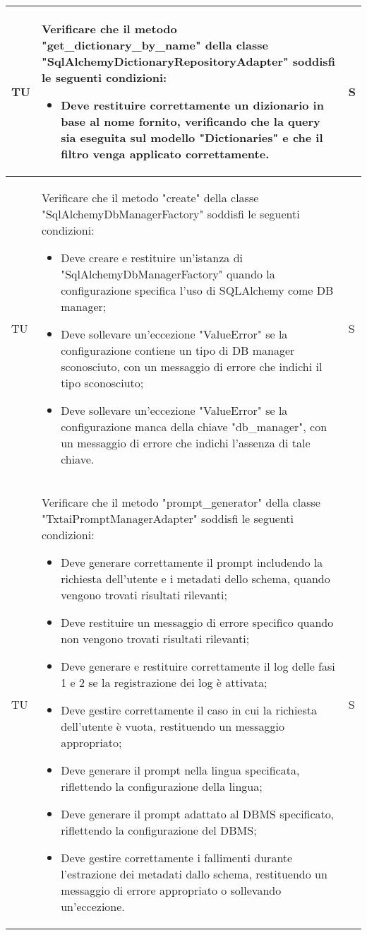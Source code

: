 \begin{adjustwidth}{-0.5cm}{-0.5cm}
\begin{longtable}{|P{1.5cm}|>{\raggedright}P{9.5cm}|>{\arraybackslash}P{1.5cm}|}
	\hline TU & Verificare che il metodo "get\_dictionary\_by\_name" della classe "SqlAlchemyDictionaryRepositoryAdapter" soddisfi le seguenti condizioni:
	\begin{itemize}
		\item Deve restituire correttamente un dizionario in base al nome fornito, verificando che la query sia eseguita sul modello "Dictionaries" e che il filtro venga applicato correttamente.
	\end{itemize} & S \\

		\hline TU & Verificare che il metodo "create" della classe "SqlAlchemyDbManagerFactory" soddisfi le seguenti condizioni:
	\begin{itemize}
		\item Deve creare e restituire un'istanza di "SqlAlchemyDbManagerFactory" quando la configurazione specifica l'uso di SQLAlchemy come DB manager;
		\item Deve sollevare un'eccezione "ValueError" se la configurazione contiene un tipo di DB manager sconosciuto, con un messaggio di errore che indichi il tipo sconosciuto;
		\item Deve sollevare un'eccezione "ValueError" se la configurazione manca della chiave "db\_manager", con un messaggio di errore che indichi l'assenza di tale chiave.
	\end{itemize} & S \\

		\hline TU & Verificare che il metodo "prompt\_generator" della classe "TxtaiPromptManagerAdapter" soddisfi le seguenti condizioni:
	\begin{itemize}
		\item Deve generare correttamente il prompt includendo la richiesta dell'utente e i metadati dello schema, quando vengono trovati risultati rilevanti;
		\item Deve restituire un messaggio di errore specifico quando non vengono trovati risultati rilevanti;
		\item Deve generare e restituire correttamente il log delle fasi 1 e 2 se la registrazione dei log è attivata;
		\item Deve gestire correttamente il caso in cui la richiesta dell'utente è vuota, restituendo un messaggio appropriato;
		\item Deve generare il prompt nella lingua specificata, riflettendo la configurazione della lingua;
		\item Deve generare il prompt adattato al DBMS specificato, riflettendo la configurazione del DBMS;
		\item Deve gestire correttamente i fallimenti durante l'estrazione dei metadati dallo schema, restituendo un messaggio di errore appropriato o sollevando un'eccezione.
	\end{itemize} & S \\


\end{longtable}
\end{adjustwidth}
